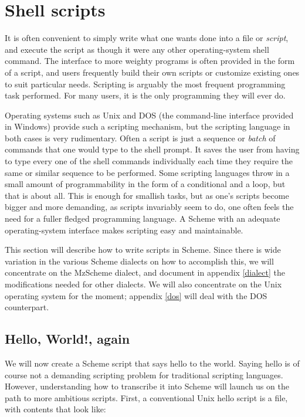 \chapter{Shell scripts}
\label{script}

It is often convenient to simply write what one wants
done into a file or {\em script}, and execute the
script as though it were any other operating-system
shell command.  The interface to more weighty programs
is often provided in the form of a script, and users
frequently build their own scripts or customize
existing ones to suit particular needs.  Scripting is
arguably the most frequent programming task performed.
For many users, it is the only programming they will
ever do.

Operating systems such as Unix and DOS (the
command-line interface provided in Windows)
provide such a scripting mechanism, but the scripting
language in both cases is very rudimentary.  Often a
script is just a sequence or {\em batch} of commands
that one would type to the shell prompt.  It saves the
user from having to type every one of the shell
commands individually each time they require the same
or similar sequence to be performed.  Some scripting
languages throw in a small amount of programmability in
the form of a conditional and a loop, but that is about
all.  This is enough for smallish tasks, but as one's
scripts become bigger and more demanding, as scripts
invariably seem to do, one often feels the need for a
fuller fledged programming language.  A Scheme with an
adequate operating-system interface makes scripting
easy and maintainable.

This section will describe how to write scripts in
Scheme.  Since there is wide variation in the various
Scheme dialects on how to accomplish this, we will
concentrate on the MzScheme dialect, and document in
appendix \ref{dialect} the modifications needed for
other dialects.  We will also concentrate on the Unix
operating system for the moment; appendix \ref{dos}
will deal with the DOS counterpart.

\section{Hello, World!, again}

We will now create a Scheme script that says hello to
the world.  Saying hello is of course not a demanding
scripting problem for traditional scripting languages.
However, understanding how to transcribe it into Scheme
will launch us on the path to more ambitious scripts.
First, a conventional Unix hello script is a file, with
contents that look like:

